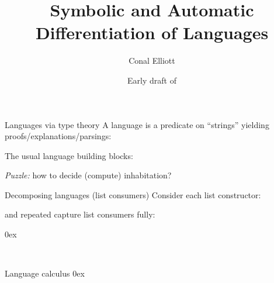 \documentclass[aspectratio=169]{beamer}
\title{Symbolic and Automatic Differentiation of Languages}
\author{Conal Elliott}
\date{Early draft of \DTMnow}
\begin{document}
\begin{center}
\maketitle
{}
\end{center}

\begin{frame}{Languages via type theory}
\vspace{1.5ex}
A language is a predicate on ``strings'' yielding proofs/explanations/parsings:

The usual language building blocks:

\vspace{-3ex}

\emph{Puzzle:} how to decide (compute) inhabitation?
\end{frame}

\begin{frame}{Decomposing languages (list consumers)}
\vspace{2ex}
Consider each list constructor:
\vspace{1.5ex}

\vspace{2ex}
 and repeated  capture list consumers fully:

\vspace{-2ex}
\begin{minipage}[c]{2.8in}
\end{minipage}
\hfill
\begin{minipage}[c]{2.5in}
\mathindent0ex
\end{minipage}
\hfill\ 
\end{frame}

\begin{frame}{Language calculus}
\vspace{-1ex}
\vfill
\mathindent0ex
\end{frame}

\end{document}
